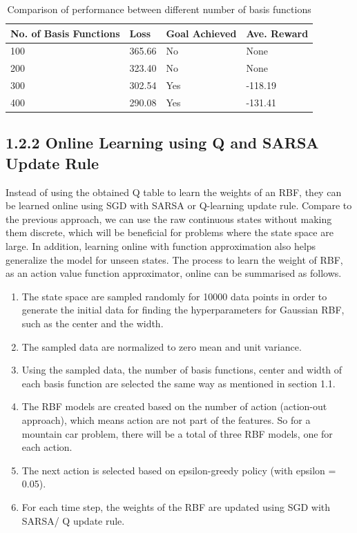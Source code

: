 \documentclass[12pt,letterpaper]{article}
\newenvironment{myitemize}
{ \begin{enumerate}
    \setlength{\itemsep}{1pt}
    \setlength{\parskip}{1pt}
    \setlength{\parsep}{1pt}     }
{ \end{enumerate}         }
\begin{document}
\begin{table}[htb]
  \centering
  \begin{tabular}{l p{1.2cm} p{3cm} p{3cm}}
  \toprule
     No. of Basis Functions & Loss & Goal Achieved & Ave. Reward\\ \midrule
  100 & 365.66 & No & None    \\ 
  200 & 323.40 & No & None   \\ 
  300 & 302.54 & Yes & -118.19   \\ 
  400 & 290.08 & Yes & -131.41   \\ 
  \bottomrule
\end{tabular}
\caption{Comparison of performance between different number of basis functions}
\label{rbf-accuracy}
\end{table}

\subsection*{1.2.2 Online Learning using Q and SARSA Update Rule}

Instead of using the obtained Q table to learn the weights of an RBF, they can be learned online using SGD with SARSA or Q-learning update rule.
Compare to the previous approach, we can use the raw continuous states without making them discrete, 
which will be beneficial for problems where the state space are large. 
In addition, learning online with function approximation also helps generalize the model for unseen states.
The process to learn the weight of RBF, as an action value function approximator, online can be summarised as follows.

\begin{myitemize}
  \item The state space are sampled randomly for 10000 data points 
  in order to generate the initial data for finding the hyperparameters for Gaussian RBF, such as the center and the width.
  \item The sampled data are normalized to zero mean and unit variance.
  \item Using the sampled data, the number of basis functions, center and width of each basis function are selected the same way as mentioned in section 1.1.
  \item The RBF models are created based on the number of action (action-out approach), which means action are not part of the features.
  So for a mountain car problem, there will be a total of three RBF models, one for each action.
  \item The next action is selected based on epsilon-greedy policy (with epsilon = 0.05).
  \item For each time step, the weights of the RBF are updated using SGD with SARSA/ Q update rule.
\end{myitemize}  
\end{document}
